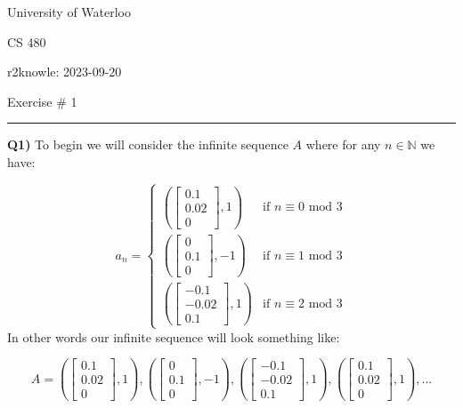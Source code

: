 \documentclass{article}
\begin{document}
\begin{titlepage}
	\setlength{\parindent}{0pt}
	\large

\vspace*{-2cm}


University of Waterloo \par
CS 480 \par
\vspace{0.05cm}
r2knowle: 2023-09-20
\vspace{0.2cm}

{\huge Exercise \# 1 \par}
\hrule

\vspace{0.5cm}
\textbf{Q1)} To begin we will consider the infinite sequence $A$ where for any $n \in \mathbb{N}$ we have: \par
\[ a_n = \begin{cases}
\left( 
\begin{bmatrix}
0.1\\
0.02\\
0
\end{bmatrix}, 1\right)   & \text{if $n \equiv 0 $ mod 3}\\
\left(
\begin{bmatrix}
0\\
0.1\\
0
\end{bmatrix}, -1\right)   & \text{if $n \equiv 1 $ mod 3}\\
\left(
\begin{bmatrix}
-0.1\\
-0.02\\
0.1
\end{bmatrix}, 1\right)   & \text{if $n \equiv 2 $ mod 3}
\end{cases}
\]
In other words our infinite sequence will look something like:

\[ A = \left( 
\begin{bmatrix}
0.1\\
0.02\\
0
\end{bmatrix}, 1\right), \left(
\begin{bmatrix}
0\\
0.1\\
0
\end{bmatrix}, -1\right), \left(
\begin{bmatrix}
-0.1\\
-0.02\\
0.1
\end{bmatrix}, 1\right),\left( 
\begin{bmatrix}
0.1\\
0.02\\
0
\end{bmatrix}, 1\right), ...  \]


\end{titlepage}
\end{document}
